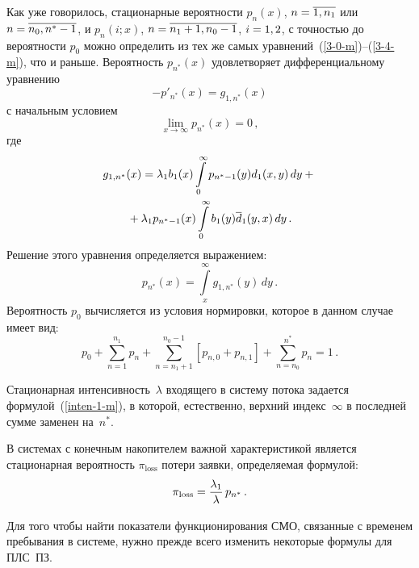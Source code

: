 \begin{multicols}{2}
Как уже говорилось, стационарные вероятности
$p_n(x)$, $n\hm=\overline{1,n_1}$ или
$n\hm=\overline{n_0,n^*-1}$, и
$p_n(i;x)$, $n\hm=\overline{n_1+1,n_0-1}$, $i\hm=1,2$,
с точностью до вероятности $p_0$ можно определить
из тех же самых уравнений~(\ref{3-0-m})--(\ref{3-4-m}),
что и раньше.
Вероятность $p_{n^*}(x)$ удовлетворяет дифференциальному
уравнению
\begin{equation*}
-p'_{n^*}(x)= g_{1,n^*}(x) 
\end{equation*}
с начальным условием
\begin{equation*}
\lim\limits_{x\to\infty} p_{n^*}(x) = 0\,,
\end{equation*}
где
\begin{multline*}
g_{1,n^*}(x) = \lambda_1 b_1(x) \int\limits_0^\infty p_{n^*-1}(y) d_1(x,y)\, dy
+{}\\
{}+ \lambda_1 p_{n^*-1}(x) \int\limits_0^\infty b_1(y) \overline d_1(y,x)\, dy\,.
\end{multline*}
Решение этого уравнения определяется вы\-ра\-же\-нием:
\begin{equation*}
p_{n^*}(x)= \int\limits_x^\infty g_{1,n^*}(y)\, dy\,.
\end{equation*}
Вероятность $p_0$ вычисляется из условия нормировки,
которое в данном случае имеет вид:
$$
p_0 + \sum\limits_{n=1}^{n_1} p_n + \sum\limits_{n=n_1+1}^{n_0-1} \left[p_{n,0} + p_{n,1}\right]+
\sum\limits_{n=n_0}^{n^*} p_n = 1\,.
$$

Стационарная интенсивность~$\lambda$ входящего в сис\-те\-му
потока задается формулой~(\ref{inten-1-m}), в которой,
естественно, верхний индекс~$\infty$ в последней сумме
заменен на~$n^*$.

В системах с конечным накопителем важной характеристикой
является стационарная вероятность $\pi_{\mathrm{loss}}$
потери заявки, определяемая формулой:
$$
\pi_{\mathrm{loss}} = \displaystyle\frac{\displaystyle \lambda_1 \mathstrut}{\displaystyle \lambda\mathstrut}\, p_{n^*}\,.
$$

Для того чтобы найти показатели функционирования СМО,
связанные с временем пребывания в системе, нужно прежде
всего изменить некоторые формулы для ПЛС~ПЗ.


\end{multicols}
